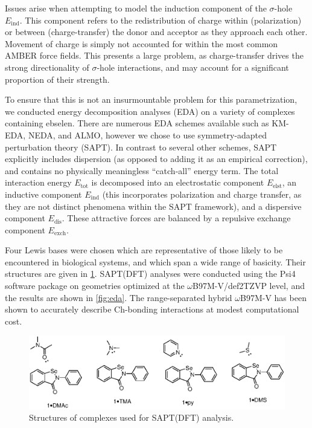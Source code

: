 \begin{refsection}
Issues arise when attempting to model the induction component of the $\sigma$-hole $E_{\mathrm{ind}}$.
This component refers to the redistribution of charge within (polarization) or between (charge-transfer) the donor and acceptor as they approach each other.
Movement of charge is simply not accounted for within the most common AMBER force fields.
This presents a large problem, as charge-transfer drives the strong directionality of $\sigma$-hole interactions, and may account for a significant proportion of their strength.

To ensure that this is not an insurmountable problem for this parametrization, we conducted energy decomposition analyses (EDA) on a variety of complexes containing ebselen.
There are numerous EDA schemes available such as KM-EDA, NEDA, and ALMO, however we chose to use symmetry-adapted perturbation theory (SAPT).\autocite{SAPT2020,Jeziorski1994PerturbationComplexes}
In contrast to several other schemes, SAPT explicitly includes dispersion (as opposed to adding it as an empirical correction), and contains no physically meaningless ``catch-all'' energy term.
The total interaction energy $E_\mathrm{tot}$ is decomposed into an electrostatic component $E_\mathrm{elst}$, an inductive component $E_\mathrm{ind}$ (this incorporates polarization and charge transfer, as they are not distinct phenomena within the SAPT framework), and a dispersive component $E_\mathrm{dis}$.
These attractive forces are balanced by a repulsive exchange component $E_\mathrm{exch}$.

Four Lewis bases were chosen which are representative of those likely to be encountered in biological systems, and which span a wide range of basicity.
Their structures are given in \cref{fig:complexes}.
SAPT(DFT) analyses were conducted using the Psi4 software package on geometries optimized at the $\omega$B97M-V/def2TZVP level, and the results are shown in \cref{fig:eda}.\autocite{Parrish2017}
The range-separated hybrid $\omega$B97M-V has been shown to accurately describe Ch-bonding interactions at modest computational cost.\autocite{Mehta2021}

\begin{figure}
    \centering
    \includegraphics[scale=0.74]{Figures/sapt-complexes.eps}
    \caption{Structures of complexes used for SAPT(DFT) analysis.}
    \label{fig:complexes}
\end{figure}


\end{refsection}
